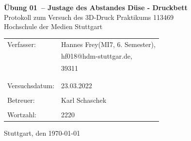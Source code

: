 \documentclass[a4paper,12pt,bibtotocnumbered]{scrartcl}
\makeatletter
\numberwithin{equation}{section} %
\newcommand{\VERSUCHSDATUM}{23.03.2022}
\newcommand{\PROTOKOLLDATUM}{\today}
\newcommand{\VerfasserEINS}{Hannes Frey}
\newcommand{\MatNoEINS}{39311}
\newcommand{\StudiengangEINS}{MI7}
\newcommand{\SemesterEINS}{6. Semester}
\newcommand{\MailEINS}{hf018@hdm-stuttgar.de}
\newcommand{\VerfasserZWEI}{Verfasser 2}
\newcommand{\MatNoZWEI}{Matrikelnummer 2}
\newcommand{\StudiengangZWEI}{Technologiemanagement}
\newcommand{\BETREUER}{Karl Schaschek}
\newcommand{\WORTZAHL}{2220}
\newcommand{\GRUPPENNR}{Z-999}
\newcommand{\VERSUCHSNR}{Übung 01}
\newcommand{\VERSUCHSNAME}{Justage des Abstandes Düse - Druckbett}
\makeatother
\begin{document}
\thispagestyle{empty}


\begin{titlepage}

\begin{center}
\Huge{\textbf{\VERSUCHSNR\ – \VERSUCHSNAME}}\\%
\vspace{10mm}%
\Large{Protokoll zum Versuch des 3D-Druck Praktikums 113469  %
}\\
\vspace{10mm} 
\Large{Hochschule der Medien Stuttgart}\\
\end{center}
\vspace{1cm}
\begin{center}
\begin{tabular}{ll}
\large{Verfasser:}		& \large{\VerfasserEINS\;(\StudiengangEINS, \SemesterEINS),} \\ 
						& \large{\MailEINS}, \\
 						& \large{\MatNoEINS} \\
						\vspace{0cm}\\
\vspace{0cm}\\
\large{Versuchsdatum:}	& \large{\VERSUCHSDATUM} \\
\vspace{0cm}\\
\large{Betreuer:}		& \large{\BETREUER} \\
\vspace{0cm}\\
\large{Wortzahl:}		& \large{\WORTZAHL}
\end{tabular}
\end{center}
\vspace{65mm}

\begin{center}
Stuttgart, den \PROTOKOLLDATUM
\end{center}

\end{titlepage}
\end{document}
